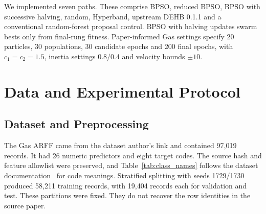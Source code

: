 We implemented seven paths. These comprise BPSO, reduced BPSO, BPSO with successive halving, random, Hyperband, upstream DEHB 0.1.1 and a conventional random-forest proposal control. BPSO with halving updates swarm bests only from final-rung fitness. Paper-informed Gas settings specify 20 particles, 30 populations, 30 candidate epochs and 200 final epochs, with $c_1=c_2=1.5$, inertia settings 0.8/0.4 and velocity bounds $\pm10$.

\section{Data and Experimental Protocol}
\subsection{Dataset and Preprocessing}
The Gas ARFF came from the dataset author's link and contained 97,019 records. It had 26 numeric predictors and eight target codes. The source hash and feature allowlist were preserved, and Table~\ref{tab:class_names} follows the dataset documentation~\cite{morris2014,hsu2014} for code meanings. Stratified splitting with seeds 1729/1730 produced 58,211 training records, with 19,404 records each for validation and test. These partitions were fixed. They do not recover the row identities in the source paper.

\begin{table}[!t]\centering\caption{Verified Gas Pipeline class names. Original numeric targets were preserved.}\label{tab:class_names}
\end{table}

